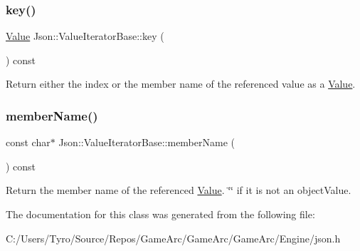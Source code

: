 \subsubsection{\texorpdfstring{key()}{key()}}
{\footnotesize\ttfamily \mbox{\hyperlink{class_json_1_1_value}{Value}} Json\+::\+Value\+Iterator\+Base\+::key (\begin{DoxyParamCaption}{ }\end{DoxyParamCaption}) const}

Return either the index or the member name of the referenced value as a \mbox{\hyperlink{class_json_1_1_value}{Value}}. \mbox{\label{class_json_1_1_value_iterator_base_ad9a0e66f1217899993273abcbc8c9283}} 
\subsubsection{\texorpdfstring{memberName()}{memberName()}}
{\footnotesize\ttfamily const char$\ast$ Json\+::\+Value\+Iterator\+Base\+::member\+Name (\begin{DoxyParamCaption}{ }\end{DoxyParamCaption}) const}

Return the member name of the referenced \mbox{\hyperlink{class_json_1_1_value}{Value}}. \char`\"{}\char`\"{} if it is not an object\+Value. 

The documentation for this class was generated from the following file\+:\begin{DoxyCompactItemize}
\item 
C\+:/\+Users/\+Tyro/\+Source/\+Repos/\+Game\+Arc/\+Game\+Arc/\+Game\+Arc/\+Engine/json.\+h\end{DoxyCompactItemize}

